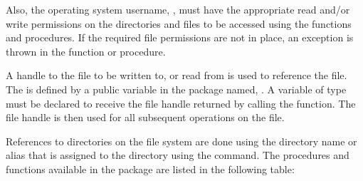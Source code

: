 \documentclass[letterpaper,10pt,english,openany,oneside]{sphinxmanual}
\begin{document}
Also, the operating system username, , must have the
appropriate read and/or write permissions on the directories and files
to be accessed using the  functions and procedures. If the
required file permissions are not in place, an exception is thrown in
the  function or procedure.

A handle to the file to be written to, or read from is used to reference
the file. The  is defined by a public variable in the
 package named, . A variable of type
 must be declared to receive the file handle returned by
calling the  function. The file handle is then used for all
subsequent operations on the file.

References to directories on the file system are done using the
directory name or alias that is assigned to the directory using the
 command. The procedures and functions available in the
 package are listed in the following table:
\end{document}
